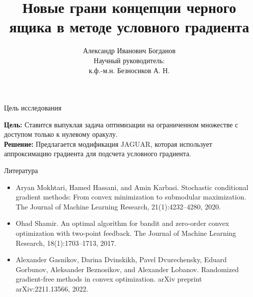 \documentclass{beamer}
\title[\hbox to 56mm{Новые грани концепции черного ящика в методе условного градиента}]{Новые грани концепции черного ящика в методе условного градиента}
\author[А. Б. Богданов]{Александр Иванович Богданов\\
                        $ $\\ 
                        Научный руководитель:\\
                        к.ф.-м.н. Безносиков А. Н.}
\institute[]{Московский физико-технический институт\\
             ФПМИ\\
             Кафедра <<Интеллектуальные системы>>}
\date{}
\begin{document}

\begin{frame}

    \maketitle

\end{frame}


\begin{frame}{Цель исследования}

    \textbf{Цель:} Ставится выпуклая задача оптимизации на ограниченном множестве с доступом только к нулевому оракулу. \\

    $ $\\

    \textbf{Решение:} Предлагается модификация JAGUAR, которая использует аппроксимацию градиента для подсчета условного градиента.
    
\end{frame}


\begin{frame}{Литература}
    \begin{itemize}
        \item Aryan Mokhtari, Hamed Hassani, and Amin Karbasi. Stochastic conditional gradient methods: From convex minimization to submodular maximization. The Journal of Machine Learning Research, 21(1):4232–4280, 2020.
        \item Ohad Shamir. An optimal algorithm for bandit and zero-order convex optimization with two-point feedback. The Journal of Machine Learning Research, 18(1):1703–1713, 2017.
        \item Alexander Gasnikov, Darina Dvinskikh, Pavel Dvurechensky, Eduard Gorbunov, Aleksander Beznosikov, and Alexander Lobanov. Randomized gradient-free methods in convex optimization. arXiv preprint arXiv:2211.13566, 2022.
    \end{itemize}

\end{frame}

\end{document}
